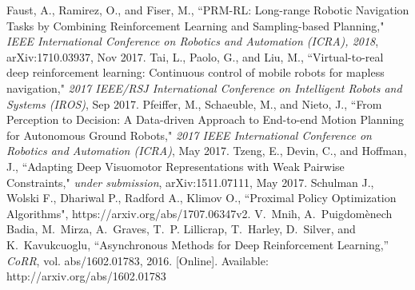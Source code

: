 \documentclass[conference]{IEEEtran}
\begin{document}
\begin{thebibliography}{100} %
 Faust, A., Ramirez, O., and Fiser, M., ``PRM-RL: Long-range Robotic Navigation Tasks by Combining Reinforcement Learning and Sampling-based Planning," \emph{IEEE International Conference on Robotics and Automation (ICRA), 2018}, arXiv:1710.03937, Nov 2017.
 Tai, L., Paolo, G., and Liu, M., ``Virtual-to-real deep reinforcement learning: Continuous control of mobile robots for mapless navigation," \emph{2017 IEEE/RSJ International Conference on Intelligent Robots and Systems (IROS)}, Sep 2017.
 Pfeiffer, M., Schaeuble, M., and Nieto, J., ``From Perception to Decision: A Data-driven Approach to End-to-end Motion Planning for Autonomous Ground Robots," \emph{2017 IEEE International Conference on Robotics and Automation (ICRA)}, May 2017.
 Tzeng, E., Devin, C., and Hoffman, J., ``Adapting Deep Visuomotor Representations with Weak Pairwise Constraints," \emph{under submission}, arXiv:1511.07111, May 2017.
 Schulman J., Wolski F., Dhariwal P., Radford A., Klimov O., ``Proximal Policy Optimization Algorithms", https://arxiv.org/abs/1707.06347v2.
V.~Mnih, A.~Puigdom{\`{e}}nech Badia, M.~Mirza, A.~Graves, T.~P. Lillicrap, T.~Harley, D.~Silver, and K.~Kavukcuoglu, ``Asynchronous Methods for Deep Reinforcement Learning,'' \emph{CoRR}, vol. abs/1602.01783, 2016. [Online]. Available: http://arxiv.org/abs/1602.01783

\end{thebibliography}





\end{document}
